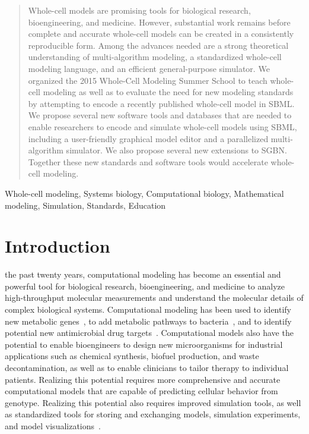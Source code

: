 \documentclass[journal,transmag]{IEEEtran}
\begin{document}
\begin{abstract}
Whole-cell models are promising tools for biological research, bioengineering, and medicine. 
However, substantial work remains before complete and accurate whole-cell models can be created in a consistently reproducible form.
Among the advances needed are a strong theoretical understanding of multi-algorithm modeling, a standardized whole-cell modeling language, and an efficient general-purpose simulator.
We organized the 2015 Whole-Cell Modeling Summer School to teach whole-cell modeling as well as to evaluate the need for new modeling standards by attempting to encode a recently published whole-cell model in SBML.
We propose several new software tools and databases that are needed to enable researchers to encode and simulate whole-cell models using SBML, including a user-friendly graphical model editor and a parallelized multi-algorithm simulator. We also propose several new extensions to SGBN.
Together these new standards and software tools would accelerate whole-cell modeling.
\end{abstract}

\begin{IEEEkeywords}
Whole-cell modeling, Systems biology, Computational biology, Mathematical modeling, Simulation, Standards, Education
\end{IEEEkeywords}

\IEEEpeerreviewmaketitle

\section{Introduction}

 the past twenty years, computational modeling has become an essential and powerful tool for biological research, bioengineering, and medicine to analyze high-throughput molecular measurements and understand the molecular details of complex biological systems. Computational modeling has  been used to identify new metabolic genes~\cite{Reed2006}, to add metabolic pathways to bacteria~\cite{Lee2012}, and to identify potential new antimicrobial drug targets~\cite{Lee2009}.
Computational models also have the potential to enable bioengineers to design new microorganisms for industrial applications such as chemical synthesis, biofuel production, and waste decontamination, as well as to enable clinicians to tailor therapy to individual patients. Realizing this potential requires more comprehensive and accurate computational models that are capable of predicting cellular behavior from genotype. Realizing this potential also requires improved simulation tools, as well as standardized tools for storing and exchanging models, simulation experiments, and model visualizations~\cite{Macklin2014,Karr2015,Karr2015b,hucka2015promoting,Klipp07,path2models2013}.
\end{document}
